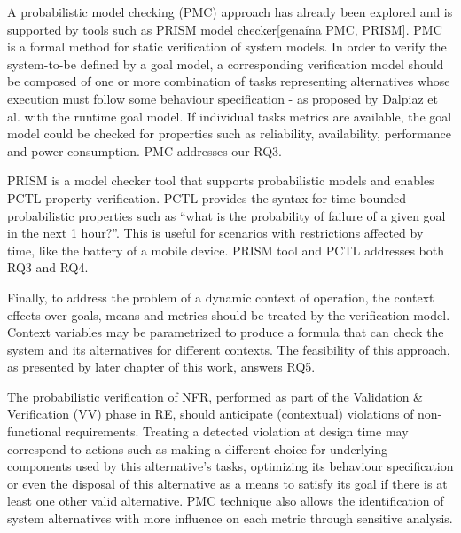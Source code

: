 
A probabilistic model checking (PMC) approach has already been explored and is supported by tools such as PRISM model checker[genaína PMC, PRISM]. PMC is a formal method for static verification of system models. In order to verify the system-to-be defined by a goal model, a corresponding verification model should be composed of one or more combination of tasks representing alternatives whose execution must follow some behaviour specification - as proposed by Dalpiaz et al. with the runtime goal model. If individual tasks metrics are available, the goal model could be checked for properties such as reliability, availability, performance and power consumption. PMC addresses our RQ3.

PRISM is a model checker tool that supports probabilistic models and enables PCTL property verification. PCTL provides the syntax for time-bounded probabilistic properties such as ``what is the probability of failure of a given goal in the next 1 hour?''. This is useful for scenarios with restrictions affected by time, like the battery of a mobile device. PRISM tool and PCTL addresses both RQ3 and RQ4.


Finally, to address the problem of a dynamic context of operation, the context effects over goals, means and metrics should be treated by the verification model. Context variables may be parametrized to produce a formula that can check the system and its alternatives for different contexts. The feasibility of this approach, as presented by later chapter of this work, answers RQ5. 

The probabilistic verification of NFR, performed as part of the Validation \& Verification (VV) phase in RE, should anticipate (contextual) violations of non-functional requirements. Treating a detected violation at design time may correspond to actions such as making a different choice for underlying components used by this alternative's tasks, optimizing its behaviour specification or even the disposal of this alternative as a means to satisfy its goal if there is at least one other valid alternative. PMC technique also allows the identification of system alternatives with more influence on each metric through sensitive analysis. 

